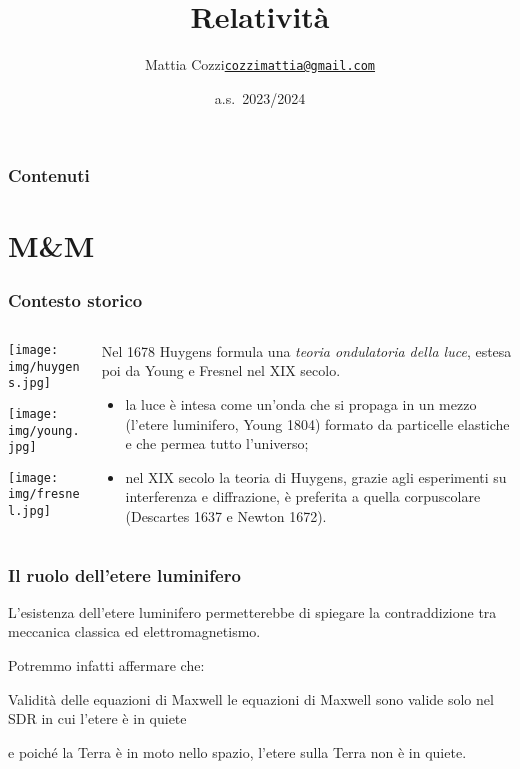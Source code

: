 \documentclass[]{beamer}
\title{Relatività}
\author{\texorpdfstring{Mattia Cozzi\newline\href{mailto:cozzimattia@gmail.com}{\texttt{cozzimattia@gmail.com}}}{Mattia Cozzi}}
\date{a.s.~2023/2024}
\theoremstyle{plain}
\begin{document}
\begin{frame}
  \titlepage
\end{frame}





\begin{frame}
\frametitle{Contenuti}
\tableofcontents
\end{frame}


\section{M{\&}M}



\begin{frame}
\frametitle{Contesto storico}
\begin{columns}
\begin{column}{0.2\textwidth}
\texttt{[image: img/huygens.jpg]}

\texttt{[image: img/young.jpg]}

\texttt{[image: img/fresnel.jpg]}
\end{column}
\begin{column}{0.7\textwidth}
Nel 1678 \alert<1>{Huygens} formula una \emph{teoria ondulatoria della luce}, estesa poi da \alert<1>{Young} e \alert<1>{Fresnel} nel XIX secolo.\pause

\begin{small}
\begin{itemize}
\item<2-> la luce è intesa come un'onda che si propaga in un mezzo (l'\alert<2>{etere luminifero}, Young 1804) formato da particelle elastiche e che permea tutto l'universo;
\item<3-> nel XIX secolo la teoria di Huygens, grazie agli esperimenti su \alert<3>{interferenza} e \alert<3>{diffrazione}, è preferita a quella corpuscolare (Descartes 1637 e Newton 1672).
\end{itemize}
\end{small}
\end{column}
\end{columns}
\end{frame}



\begin{frame}
  \frametitle{Il ruolo dell'etere luminifero}
  L'esistenza dell'etere luminifero permetterebbe di spiegare la contraddizione tra meccanica classica ed elettromagnetismo.\pause
  
  Potremmo infatti affermare che:
  \begin{block}{Validità delle equazioni di Maxwell}
    le equazioni di Maxwell sono valide solo nel SDR in cui l'etere è in quiete
  \end{block}
e poiché la Terra è in moto nello spazio, l'etere sulla Terra non è in quiete.
\end{frame}
\end{document}
